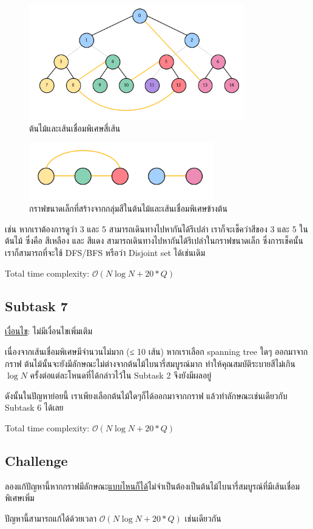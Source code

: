 \documentclass[12pt]{article}
\begin{document}
\begin{figure}[h]
  \centering
  \includegraphics[height=5cm]{./images/castle5.png}
  \captionsetup{labelformat=empty}
  \caption{ต้นไม้และเส้นเชื่อมพิเศษสี่เส้น}
\end{figure}

\begin{figure}[h]
  \centering
  \includegraphics[height=2.5cm]{./images/castle6.png}
  \captionsetup{labelformat=empty}
  \caption{กราฟขนาดเล็กที่สร้างจากกลุ่มสีในต้นไม้และเส้นเชื่อมพิเศษข้างต้น}
\end{figure}

เช่น หากเราต้องการดูว่า 3 และ 5 สามารถเดินทางไปหากันได้รึเปล่า เราก็จะเช็คว่าสีของ 3 และ 5 ในต้นไม้ ซึ่งคือ สีเหลือง และ สีแดง สามารถเดินทางไปหากันได้รึเปล่าในกราฟขนาดเล็ก ซึ่งการเช็คนั้นเราก็สามารถที่จะใช้ DFS/BFS หรือว่า Disjoint set ได้เช่นเดิม

Total time complexity: $\mathcal{O}(N \log N + 20 * Q)$

\subsection{Subtask 7}

\underline{เงื่อนไข}: ไม่มีเงื่อนไขเพิ่มเติม

เนื่องจากเส้นเชื่อมพิเศษมีจำนวนไม่มาก (≤ 10 เส้น) หากเราเลือก spanning tree ใดๆ ออกมาจากกราฟ ต้นไม้นั้นจะยังมีลักษณะไม่ต่างจากต้นไม้ไบนารี่สมบูรณ์มาก ทำให้คุณสมบัติระบายสีไม่เกิน $\log N$ ครั้งต่อแต่ละโหนดที่ได้กล่าวไว้ใน Subtask 2 จึงยังมีผลอยู่

ดังนั้นในปัญหาย่อยนี้ เราเพียงเลือกต้นไม้ใดๆก็ได้ออกมาจากกราฟ แล้วทำลักษณะเช่นเดียวกับ Subtask 6 ได้เลย

Total time complexity: $\mathcal{O}(N \log N + 20 * Q)$

\subsection{Challenge}

ลองแก้ปัญหานี้หากกราฟมีลักษณะ\underline{แบบไหนก็ได้}ไม่จำเป็นต้องเป็นต้นไม้ไบนารี่สมบูรณ์ที่มีเส้นเชื่อมพิเศษเพิ่ม

ปัญหานี้สามารถแก้ได้ด้วยเวลา $\mathcal{O}(N \log N + 20 * Q)$ เช่นเดียวกัน
\end{document}
